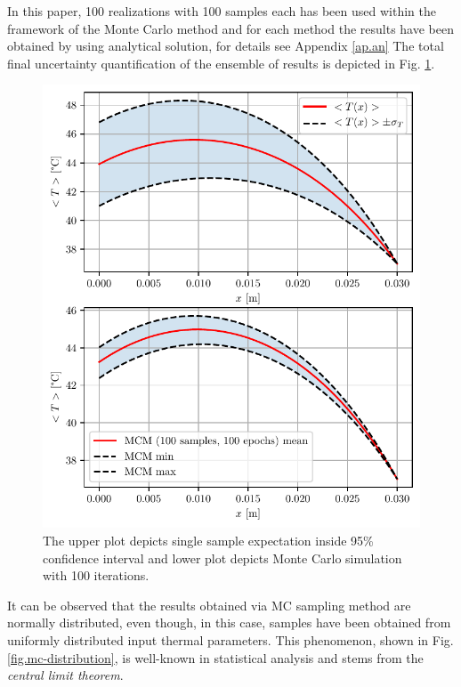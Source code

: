 \documentclass[conference]{IEEEtran}
\begin{document}
In this paper, 100 realizations with 100 samples each has been used within the framework of the Monte Carlo method and for each method the results have been obtained by using analytical solution, for details see Appendix \ref{ap.an} The total final uncertainty quantification of the ensemble of results is depicted in Fig. \ref{fig.mc}.
\begin{figure}[]
\centering
 \includegraphics[width=\linewidth]{figs/mc-simulation-100epochs-100samples.pdf}
\caption{The upper plot depicts single sample expectation inside 95\% confidence interval and lower plot depicts Monte Carlo simulation with 100 iterations.}
\label{fig.mc}
\end{figure}
It can be observed that the results obtained via MC sampling method are normally distributed, even though, in this case, samples have been obtained from uniformly distributed input thermal parameters. This phenomenon, shown in Fig. \ref{fig.mc-distribution}, is well-known in statistical analysis and stems from the \emph{central limit theorem}.
\end{document}
